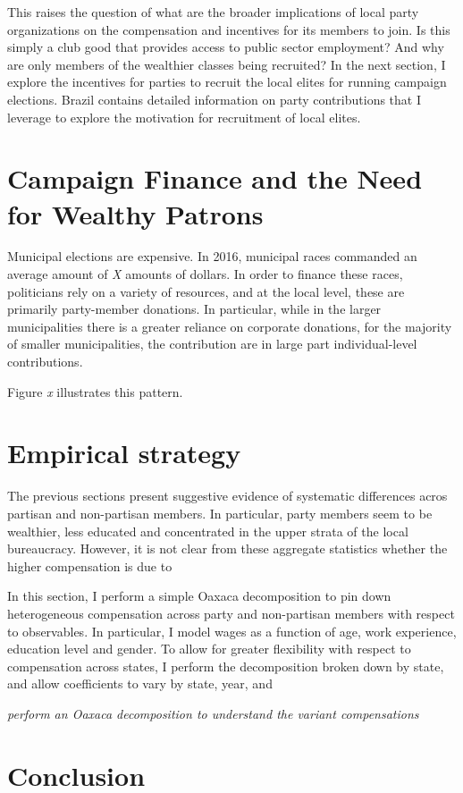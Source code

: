 \documentclass[12pt,a4paper]{article}
\begin{document}
This raises the question of what are the broader implications of local party organizations on the compensation and incentives for its members to join. Is this simply a club good that provides access to public sector employment? And why are only members of the wealthier classes being recruited? In the next section, I explore the incentives for parties to recruit the local elites for running campaign elections. Brazil contains detailed information on party contributions that I leverage to explore the motivation for recruitment of local elites. 

\section{Campaign Finance and the Need for Wealthy Patrons}
Municipal elections are expensive. In 2016, municipal races commanded an average amount of \emph{X} amounts of dollars. In order to finance these races, politicians rely on a variety of resources, and at the local level, these are primarily party-member donations. In particular, while in the larger municipalities there is a greater reliance on corporate donations, for the majority of smaller municipalities, the contribution are in large part individual-level contributions.\

Figure \emph{x} illustrates this pattern.

\section{Empirical strategy}
\label{sec:empirical}
The previous sections present suggestive evidence of systematic differences acros partisan and non-partisan members. In particular, party members seem to be wealthier, less educated and concentrated in the upper strata of the local bureaucracy. However, it is not clear from these aggregate statistics whether the higher compensation is due to 

In this section, I perform a simple Oaxaca decomposition to pin down heterogeneous compensation across party and non-partisan members with respect to observables. In particular, I model wages as a function of age, work experience, education level and gender. To allow for greater flexibility with respect to compensation across states, I perform the decomposition broken down by state, and allow coefficients to vary by state, year, and 

\emph{perform an Oaxaca decomposition to understand the variant compensations}

\section{Conclusion}
\label{sec:conclusion}

\newpage


\end{document}
